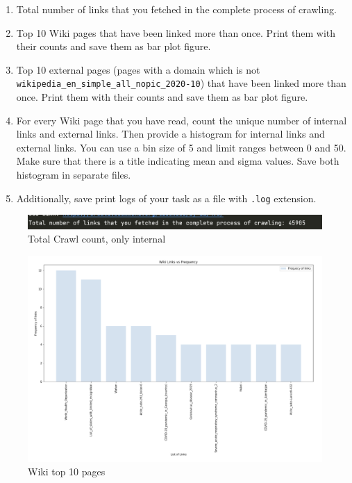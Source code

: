 \documentclass{resources/WeSTassignment}
\begin{document}
\begin{enumerate}
\item Total number of links that you fetched in the complete process of crawling.
\item Top 10 Wiki pages that have been linked more than once. Print them with their counts and save them as bar plot figure.
\item Top 10 external pages (pages with a domain which is not \texttt{wikipedia\_en\_simple\_all\_nopic\_2020-10}) that have been linked more than once. Print them with their counts and save them as bar plot figure.
\item For every Wiki page that you have read, count the unique number of internal links and external links. Then provide a histogram for internal links and external links. You can use a bin size of 5 and limit ranges between 0 and 50. Make sure that there is a title indicating mean and sigma values. Save both histogram in separate files.
\item Additionally, save print logs of your task as a file with \texttt{.log} extension.
\end{enumerate}
\begin{figure}[h]
    \centering
    \includegraphics[scale=0.5]{resources/crawl_count.png}
    \caption{Total Crawl count, only internal}  
    \label{fig:crawl count}
\end{figure}
\begin{figure}[h]
    \centering
    \includegraphics[scale=0.5]{resources/internal.png}
    \caption{Wiki top 10 pages}  
    \label{fig:Wiki top 10 pages}
\end{figure}
\end{document}
